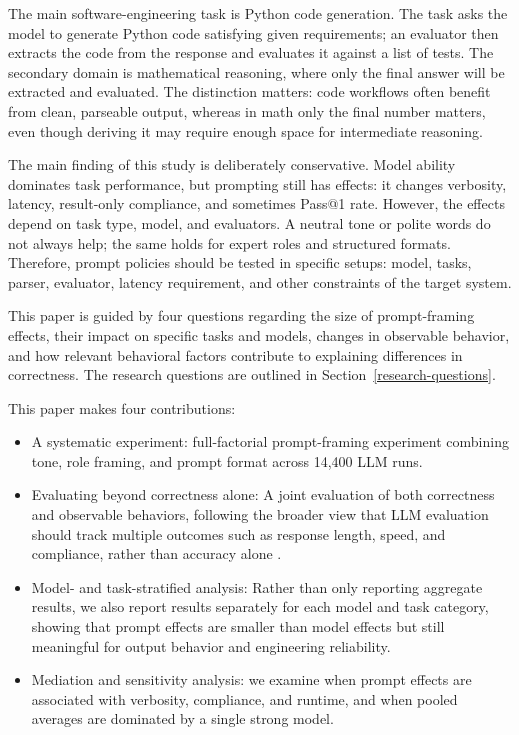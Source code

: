 \documentclass{llncs}
\providecommand{\tightlist}{%
  \setlength{\itemsep}{0pt}\setlength{\parskip}{0pt}}
\begin{document}
    The main software-engineering task is Python code generation. The task asks the model to generate Python code satisfying given requirements; an evaluator then extracts the code from the response and evaluates it against a list of tests. The secondary domain is mathematical reasoning, where only the final answer will be extracted and evaluated. The distinction matters: code workflows often benefit from clean, parseable output, whereas in math only the final number matters, even though deriving it may require enough space for intermediate reasoning.

    The main finding of this study is deliberately conservative. Model ability dominates task performance, but prompting still has effects: it changes verbosity, latency, result-only compliance, and sometimes Pass@1 rate. However, the effects depend on task type, model, and evaluators. A neutral tone or polite words do not always help; the same holds for expert roles and structured formats. Therefore, prompt policies should be tested in specific setups: model, tasks, parser, evaluator, latency requirement, and other constraints of the target system.

    This paper is guided by four questions regarding the size of prompt-framing effects, their impact on specific tasks and models, changes in observable behavior, and how relevant behavioral factors contribute to explaining differences in correctness. The research questions are outlined in Section~\ref{research-questions}.

    This paper makes four contributions:

\begin{itemize}
\tightlist
\item
  A systematic experiment: full-factorial prompt-framing experiment combining tone, role framing, and prompt format across 14,400 LLM runs.
\item
  Evaluating beyond correctness alone: A joint evaluation of both correctness and observable behaviors, following the broader view that LLM evaluation should track multiple outcomes such as response length, speed, and compliance, rather than accuracy alone \citep{liang2023helm}.
\item
  Model- and task-stratified analysis: Rather than only reporting aggregate results, we also report results separately for each model and task category, showing that prompt effects are smaller than model effects but still meaningful for output behavior and engineering reliability.
\item
  Mediation and sensitivity analysis: we examine when prompt effects are associated with verbosity, compliance, and runtime, and when pooled averages are dominated by a single strong model.
\end{itemize}
\end{document}
